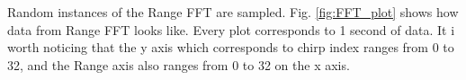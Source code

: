 Random instances of the Range FFT are sampled. Fig. \ref{fig:FFT_plot} shows how data from Range FFT looks like. Every plot corresponds to 1 second of data. It i worth noticing that the y axis which corresponds to chirp index ranges from 0 to 32, and the Range axis also ranges from 0 to 32 on the x axis. 